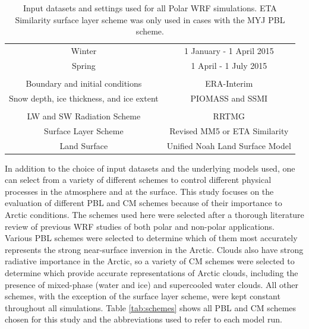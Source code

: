 \begin{table}[t]
\centering
\footnotesize
\doublespacing
{
\begin{tabular}{| c | c |}
\hline
\rowcolor[HTML]{F3F3F3} \multicolumn{2}{|c|}{\textbf{Dates}} \\
\hline
Winter & 1 January - 1 April 2015 \\
Spring & 1 April - 1 July 2015 \\
\hline
 \rowcolor[HTML]{F3F3F3} \multicolumn{2}{|c|}{\textbf{Input Datasets}} \\
\hline
 Boundary and initial conditions & ERA-Interim \\
 Snow depth, ice thickness, and ice extent & PIOMASS and SSMI \\
\hline
\rowcolor[HTML]{F3F3F3} \multicolumn{2}{|c|}{\textbf{Polar WRF Settings}} \\
\hline
 LW and SW Radiation Scheme & RRTMG \\ 
 Surface Layer Scheme & Revised MM5 or ETA Similarity \\
 Land Surface & Unified Noah Land Surface Model  \\ 
  \hline
\end{tabular}}
\caption[WRF input datasets, dates, and settings.]{Input datasets and settings used for all Polar WRF simulations. ETA Similarity surface layer scheme was only used in cases with the MYJ PBL scheme.}
\label{tab:setup}
\end{table}

In addition to the choice of input datasets and the underlying models used, one can select from a variety of different schemes to control different physical processes in the atmosphere and at the surface. This study focuses on the evaluation of different PBL and CM schemes because of their importance to Arctic conditions. The schemes used here were selected after a thorough literature review of previous WRF studies of both polar and non-polar applications. Various PBL schemes were selected to determine which of them most accurately represents the strong near-surface inversion in the Arctic. Clouds also have strong radiative importance in the Arctic, so a variety of CM schemes were selected to determine which provide accurate representations of Arctic clouds, including the presence of mixed-phase (water and ice) and supercooled water clouds. All other schemes, with the exception of the surface layer scheme, were kept constant throughout all simulations. Table \ref{tab:schemes} shows all PBL and CM schemes chosen for this study and the abbreviations used to refer to each model run. 

